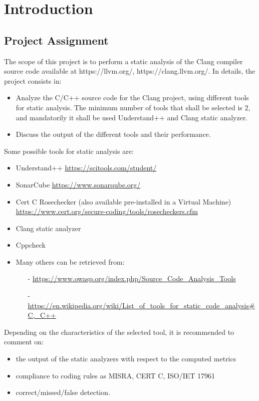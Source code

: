\chapter{Introduction}

\section{Project Assignment}

The scope of this project is to perform a static analysis of the Clang compiler source code available at
https://llvm.org/, https://clang.llvm.org/.
In details, the project consists in:
\begin{itemize}
	\item Analyze the C/C++ source code for the Clang project, using different tools for static analysis. The
minimum number of tools that shall be selected is 2, and mandatorily it shall be used Understand++ and Clang static analyzer.
	\item Discuss the output of the different tools and their performance.
\end{itemize}
Some possible tools for static analysis are:
\begin{itemize}
	\item Understand++ \url{https://scitools.com/student/}
	\item SonarCube \url{https://www.sonarqube.org/}
	\item Cert C Rosechecker (also available pre-installed in a Virtual Machine) \url{https://www.cert.org/secure-coding/tools/rosecheckers.cfm}
	\item Clang static analyzer
	\item Cppcheck
	\item Many others can be retrieved from:
	\begin{itemize}		
	 	\item[ - ]\url{https://www.owasp.org/index.php/Source_Code_Analysis_Tools}
		\item[ - ]\url{https://en.wikipedia.org/wiki/List_of_tools_for_static_code_analysis\#C,_C++}
	\end{itemize}
\end{itemize}

Depending on the characteristics of the selected tool, it is recommended to comment on:
\begin{itemize}
	\item the output of the static analyzers with respect to the computed metrics
	\item compliance to coding rules as MISRA, CERT C, ISO/IET 17961
	\item correct/missed/false detection.
\end{itemize}

